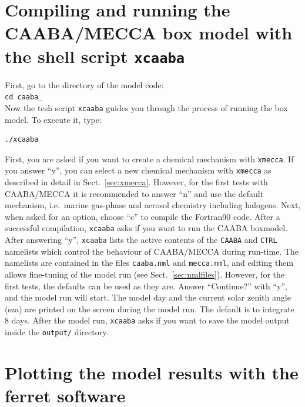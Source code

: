\documentclass[twoside]{article}
\begin{document}
\section{Compiling and running the CAABA/MECCA box model with the shell
  script {\tt xcaaba}}
\label{sec:execute}

First, go to the directory of the model code:\\[2mm]
{\tt cd caaba\_\meccaversion}\\[2mm]
Now the tcsh script \verb|xcaaba| guides you through the process of
running the box model. To execute it, type:
\begin{verbatim}
./xcaaba
\end{verbatim}
First, you are asked if you want to create a chemical mechanism with
\verb|xmecca|. If you answer ``y'', you can select a new chemical
mechanism with \verb|xmecca| as described in detail in
Sect.~\ref{sec:xmecca}. However, for the first tests with CAABA/MECCA it
is recommended to answer ``n'' and use the default mechanism, i.e.\
marine gas-phase and aerosol chemistry including halogens. Next, when
asked for an option, choose ``c'' to compile the Fortran90 code. After a
successful compilation, \verb|xcaaba| asks if you want to run the CAABA
boxmodel. After answering ``y'', \verb|xcaaba| lists the active contents
of the \verb|CAABA| and \verb|CTRL| namelists which control the
behaviour of CAABA/MECCA during run-time. The namelists are contained in
the files \verb|caaba.nml| and \verb|mecca.nml|, and editing them allows
fine-tuning of the model run (see Sect.~\ref{sec:nmlfiles}). However,
for the first tests, the defaults can be used as they are. Answer
``Continue?'' with ``y'', and the model run will start. The model day
and the current solar zenith angle (sza) are printed on the screen
during the model run. The default is to integrate 8 days. After the
model run, \verb|xcaaba| asks if you want to save the model output
inside the \verb|output/| directory.

\section{Plotting the model results with the ferret software}
\label{sec:ferret}
\end{document}
